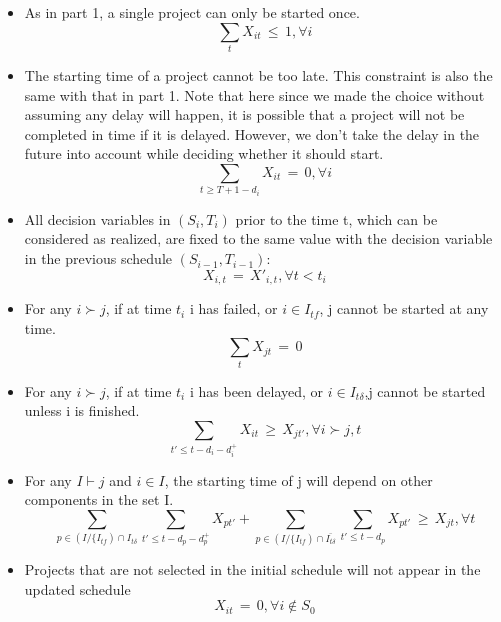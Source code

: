 \documentclass[final,3p,times]{elsarticle}
\begin{document}
\begin{itemize}\label{StartCon}
\item As in part 1, a single project can only be started once.
\begin{equation}
\sum\limits_{t} X_{it}\,\leq\,1,\forall i
\end{equation}
\item The starting time of a project cannot be too late. This constraint is also the same with that in part 1. Note that here since we made the choice without assuming any delay will happen, it is possible that a project will not be completed in time if it is delayed. However, we don't take the delay  in the future into account while deciding whether it should start.
\begin{equation}
\sum\limits_{t\geq T+1-d_i} X_{it}\,=\,0, \forall i
\end{equation}
\item All decision variables in $(S_i, T_i)$ prior to the time t, which can be considered as realized, are fixed to the same value with the decision variable in the previous schedule $(S_{i-1},T_{i-1})$:
\begin{equation}
X_{i,t}\,=\,X'_{i,t}, \forall t < t_i
\end{equation}
\item For any $i\succ j$, if at time $t_i$ i has failed, or $i\in I_{tf}$, j cannot be started at any time.
\begin{equation}
\sum\limits_{t} X_{jt}\,=\,0
\end{equation}
\item For any $i\succ j$, if at time $t_i$ i has been delayed, or $i\in I_{t\delta}$,j cannot be started unless i is finished.
\begin{equation}
\sum\limits_{t'\leq t-d_i-d^+_i} X_{it} \,\geq\, X_{jt'},\forall i\succ j, t 
\end{equation}
\item For any $I \vdash j$ and $i \in I$, the starting time of j will depend on other components in the set I. 
\begin{equation}
\sum\limits_{p \in (I/\{ I_{tf})\cap I_{t\delta}}\sum\limits_{t'\leq t-d_p-d^+_p} X_{pt'}+\sum\limits_{p \in (I/\{ I_{tf})\cap \bar{I_{t\delta}}}\sum\limits_{t'\leq t-d_p} X_{pt'}\,\geq\,X_{jt}, \forall t
\end{equation}
\item Projects that are not selected in the initial schedule will not appear in the updated schedule
\begin{equation}\label{EndCon}
X_{it}\,=\,0, \forall i \notin S_0 
\end{equation}

\end{itemize}
\end{document}
